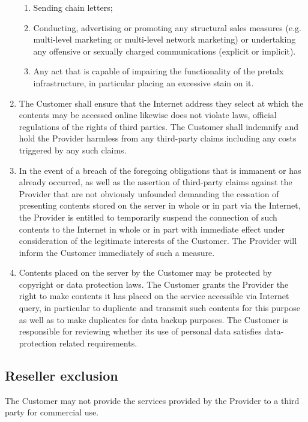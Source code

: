 \documentclass{terms}
\begin{document}
\begin{enumerate}
\begin{enumerate}
\item Sending chain letters;
\item Conducting, advertising or promoting any structural sales measures (e.g. multi-level marketing or multi-level network marketing) or undertaking any offensive or sexually charged communications (explicit or implicit).
\item Any act that is capable of impairing the functionality of the pretalx infrastructure, in particular placing an excessive stain on it.
\end{enumerate}
\item The Customer shall ensure that the Internet address they select at which the contents may be accessed online likewise does not violate laws, official regulations of the rights of third parties.
      The Customer shall indemnify and hold the Provider harmless from any third-party claims including any costs triggered by any such claims.
\item In the event of a breach of the foregoing obligations that is immanent or has already occurred, as well as the assertion of third-party claims against the Provider that are not obviously unfounded demanding the cessation of presenting contents stored on the server in whole or in part via the Internet, the Provider is entitled to temporarily suspend the connection of such contents to the Internet in whole or in part with immediate effect under consideration of the legitimate interests of the Customer.
      The Provider will inform the Customer immediately of such a measure.
\item Contents placed on the server by the Customer may be protected by copyright or data protection laws.
      The Customer grants the Provider the right to make contents it has placed on the service accessible via Internet query, in particular to duplicate and transmit such contents for this purpose as well as to make duplicates for data backup purposes.
      The Customer is responsible for reviewing whether its use of personal data satisfies data-protection related requirements.
\end{enumerate}

\subsection{Reseller exclusion}
The Customer may not provide the services provided by the Provider to a third party for commercial use.
\end{document}
